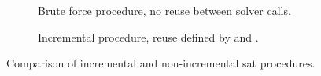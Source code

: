 \begin{figure}[h]
  \begin{subfigure}[t]{.45\textwidth}
    
    \vspace{1.2em}
    \caption{Brute force procedure, no reuse between solver calls.}%
    \label{fig:bkg:bf}
  \end{subfigure}%
  \hfill
  \begin{subfigure}[t]{.45\textwidth}
    
    \caption{Incremental procedure, reuse defined by  and .}%
    \label{fig:bkg:inc}
  \end{subfigure}
  \caption{Comparison of incremental and non-incremental \ac{sat} procedures.}%
  \label{fig:bkg}
\end{figure}